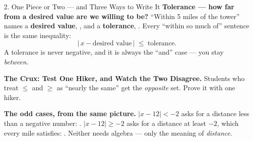 \begin{notesbox}{2. One Piece or Two --- and Three Ways to Write It}
\vspace{5pt}
\textbf{Tolerance --- how far from a desired value are we willing to be?} ``Within 5 miles of
the tower'' names a \textbf{desired value}, \blank{1.2cm}, and a \textbf{tolerance}, \blank{1.2cm}.
Every ``within so much of'' sentence is the same inequality:
\[ |\,x - \text{desired value}\,| \;\le\; \text{tolerance}. \]
A tolerance is never negative, and it is always the ``and'' case --- you stay \emph{between}.

\vspace{8pt}
\textbf{\textcolor{forest}{The Crux: Test One Hiker, and Watch the Two Disagree.}}
Students who treat $\le$ and $\ge$ as ``nearly the same'' get the \emph{opposite} set. Prove it
with one hiker.

\vspace{3pt}
\begin{center}
\end{center}

\vspace{4pt}
\textbf{The odd cases, from the same picture.} $|x-12| < -2$ asks for a distance less than a
negative number: \blank{2.2cm}. $|x-12| \ge -2$ asks for a distance at least $-2$, which every
mile satisfies: \blank{2.6cm}. Neither needs algebra --- only the meaning of \emph{distance}.
\end{notesbox}

\vspace{6pt}

